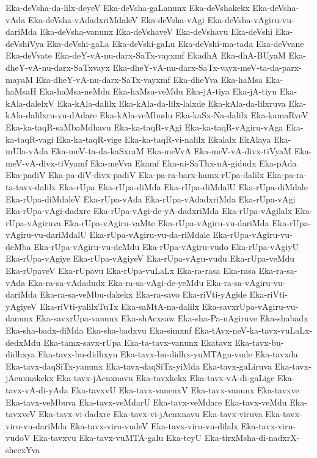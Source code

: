 {Eka-deVsha-da-lilx-deyeV
Eka-deVsha-gaLanunx
Eka-deVshakekx
Eka-deVsha-vAda
Eka-deVsha-vAdadxriMdaleV
Eka-deVsha-vAgi
Eka-deVsha-vAgiru-vu-dariMda
Eka-deVsha-vanunx
Eka-deVshaveV
Eka-deVshavu
Eka-deVshi
Eka-deVshiVya
Eka-deVshi-gaLa
Eka-deVshi-gaLu
Eka-deVshi-ma-tada
Eka-deVvane
Eka-deVvate
Eka-deY-vA-nu-darx-SaTx-vayxmf
EkadhA
Eka-dhA-BUyaM
Eka-dheY-vA-nu-darx-SaTxvayx
Eka-dheY-vA-nu-darx-SaTx-vayx-meV-ta-da-parx-mayaM
Eka-dheY-vA-nu-darx-SaTx-vayxmf
Eka-dheYva
Eka-haMsa
Eka-haMsaH
Eka-haMsa-neMdu
Eka-haMsa-veMdu
Eka-jA-tiya
Eka-jA-tiyu
Eka-kAla-dalelxV
Eka-kAla-dalilx
Eka-kAla-da-lilx-lalxde
Eka-kAla-da-lilxruva
Eka-kAla-dalilxru-vu-dAdare
Eka-kAla-veMbudu
Eka-kaSx-Na-dalilx
Eka-kamaRveV
Eka-ka-taqR-saMbaMdhavu
Eka-ka-taqR-vAgi
Eka-ka-taqR-vAgiru-vAga
Eka-ka-taqR-vagi
Eka-ka-taqR-vige
Eka-ka-taqR-vi-nalilx
Ekalalx
EkAlaya
Eka-mUla-vAda
Eka-meV-ta-da-kaSxraM
Eka-meVvA
Eka-meV-vA-divx-tiVyaM
Eka-meV-vA-divx-tiVyamf
Eka-meVva
Ekamf
Eka-ni-SaThx-nA-gidudx
Eka-pAda
Eka-padiV
Eka-pa-diV-divx-padiV
Eka-pa-ra-barx-hamx-rUpa-dalilx
Eka-pa-ra-ta-tavx-dalilx
Eka-rUpa
Eka-rUpa-diMda
Eka-rUpa-diMdalU
Eka-rUpa-diMdale
Eka-rUpa-diMdaleV
Eka-rUpa-vAda
Eka-rUpa-vAdadxriMda
Eka-rUpa-vAgi
Eka-rUpa-vAgi-dadxre
Eka-rUpa-vAgi-de-yA-dadxriMda
Eka-rUpa-vAgilalx
Eka-rUpa-vAgiruva
Eka-rUpa-vAgiru-vaMte
Eka-rUpa-vAgiru-vu-dariMda
Eka-rUpa-vAgiru-vu-dariMdalU
Eka-rUpa-vAgiru-vu-da-riMdale
Eka-rUpa-vAgiru-vu-deMba
Eka-rUpa-vAgiru-vu-deMdu
Eka-rUpa-vAgiru-vudo
Eka-rUpa-vAgiyU
Eka-rUpa-vAgiye
Eka-rUpa-vAgiyeV
Eka-rUpa-vAgu-vudu
Eka-rUpa-veMdu
Eka-rUpaveV
Eka-rUpavu
Eka-rUpa-vuLaLx
Eka-ra-rasa
Eka-rasa
Eka-ra-sa-vAda
Eka-ra-sa-vAdadudx
Eka-ra-sa-vAgi-de-yeMdu
Eka-ra-sa-vAgiru-vu-dariMda
Eka-ra-sa-veMbu-dakekx
Eka-ra-savo
Eka-riVti-yAgide
Eka-riVti-yAgiyeV
Eka-riVti-yalilxTuTx
Eka-saMtA-na-dalilx
Eka-savxrUpa-vAgiru-vu-danunx
Eka-savxrUpa-vanunx
Eka-shAcxsaw
Eka-sha-Pa-nAgiruve
Eka-shabadx
Eka-sha-badx-diMda
Eka-sha-badxvu
Eka-simxnf
Eka-tAvx-neV-ka-tavx-vuLaLx-dedxMdu
Eka-tamx-savx-rUpa
Eka-ta-tavx-vanunx
Ekatavx
Eka-tavx-bu-didhxya
Eka-tavx-bu-didhxyu
Eka-tavx-bu-didhx-yuMTAgu-vude
Eka-tavxda
Eka-tavx-daqSiTx-yanunx
Eka-tavx-daqSiTx-yiMda
Eka-tavx-gaLiruva
Eka-tavx-jAcnxnakekx
Eka-tavx-jAcnxnavu
Eka-tavxkekx
Eka-tavx-vA-di-gaLige
Eka-tavx-vA-di-yAda
Eka-tavxvU
Eka-tavx-vanenxV
Eka-tavx-vanunx
Eka-tavxve
Eka-tavx-veMbuva
Eka-tavx-veMdarU
Eka-tavx-veMdare
Eka-tavx-veMdu
Eka-tavxveV
Eka-tavx-vi-dadxre
Eka-tavx-vi-jAcnxnavu
Eka-tavx-viruva
Eka-tavx-viru-vu-dariMda
Eka-tavx-viru-vudeV
Eka-tavx-viru-vu-dilalx
Eka-tavx-viru-vudoV
Eka-tavxvu
Eka-tavx-vuMTA-galu
Eka-teyU
Eka-tirxMsha-di-nadxrX-shecxYva
}

